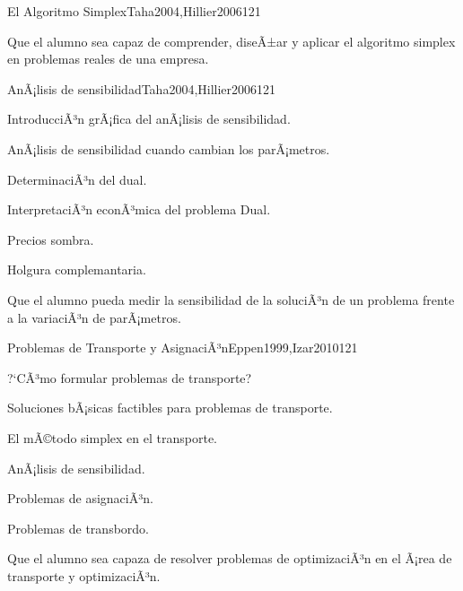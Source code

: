 \begin{syllabus}
\begin{unit}{El Algoritmo Simplex}{Taha2004,Hillier2006}{12}{1}
   \begin{unitgoals}
      \item Que el alumno sea capaz de comprender, diseÃ±ar y aplicar el algoritmo simplex en problemas reales de una empresa.
   \end{unitgoals}
\end{unit}

\begin{unit}{AnÃ¡lisis de sensibilidad}{Taha2004,Hillier2006}{12}{1}
   \begin{topics}
      \item IntroducciÃ³n grÃ¡fica del anÃ¡lisis de sensibilidad.
      \item AnÃ¡lisis de sensibilidad cuando cambian los parÃ¡metros.
      \item DeterminaciÃ³n del dual.
      \item InterpretaciÃ³n econÃ³mica del problema Dual.
      \item Precios sombra.
      \item Holgura complemantaria.
   \end{topics}

   \begin{unitgoals}
      \item Que el alumno pueda medir la sensibilidad de la soluciÃ³n de un problema frente a la variaciÃ³n de parÃ¡metros.
   \end{unitgoals}
\end{unit}

\begin{unit}{Problemas de Transporte y AsignaciÃ³n}{Eppen1999,Izar2010}{12}{1}
   \begin{topics}
      \item ?`CÃ³mo formular problemas de transporte?
      \item Soluciones bÃ¡sicas factibles para problemas de transporte.
      \item El mÃ©todo simplex en el transporte.
      \item AnÃ¡lisis de sensibilidad.
      \item Problemas de asignaciÃ³n.
      \item Problemas de transbordo.
   \end{topics}

   \begin{unitgoals}
      \item Que el alumno sea capaza de resolver problemas de optimizaciÃ³n en el Ã¡rea de transporte y optimizaciÃ³n.
   \end{unitgoals}
\end{unit}


\end{syllabus}
